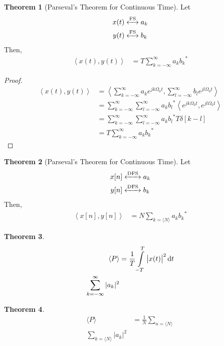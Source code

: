 \documentclass[titlepage, fleqn, a4paper, 12pt, twoside]{article}
\theoremstyle{definition}
\theoremstyle{theorem}
\newtheorem{theorem}{Theorem}
\newcommand{\FS}{\xleftrightarrow{\mathrm{FS}}}
\newcommand{\DFS}{\xleftrightarrow{\mathrm{DFS}}}
\begin{document}
\begin{theorem}[Parseval's Theorem for Continuous Time]
	Let
	\begin{align*}
		x(t) &\FS a_k\\
		y(t) &\FS b_k
	\end{align*}
	Then,
	\begin{align*}
		\left\langle x(t),y(t) \right\rangle &= T \sum\limits_{k = -\infty}^{\infty} a_k {b_k}^*
	\end{align*}
	\label{thm:Parseval's_Theorem_for_Continuous_Time}
\end{theorem}

\begin{proof}
	\begin{align*}
		\left\langle x(t),y(t) \right\rangle &= \left\langle \sum\limits_{k = -\infty}^{\infty} a_k e^{j k \Omega_0 t} , \sum\limits_{l = -\infty}^{\infty} b_l e^{j l \Omega_0 t} \right\rangle\\
		&= \sum\limits_{k = -\infty}^{\infty} \sum\limits_{l = -\infty}^{\infty} a_k {b_l}^* \left\langle e^{j k \Omega_0 t} , e^{j l \Omega_0 t} \right\rangle\\
		&= \sum\limits_{k = -\infty}^{\infty} \sum\limits_{l = -\infty}^{\infty} a_k {b_l}^* T \delta[k - l]\\
		&= T \sum\limits_{k = -\infty}^{\infty} a_k {b_k}^*
	\end{align*}
\end{proof}

\begin{theorem}[Parseval's Theorem for Continuous Time]
	Let
	\begin{align*}
		x[n] &\DFS a_k\\
		y[n] &\DFS b_k
	\end{align*}
	Then,
	\begin{align*}
		\left\langle x[n],y[n] \right\rangle &= N \sum\limits_{k = \langle N \rangle} a_k {b_k}^*
	\end{align*}
	\label{thm:Parseval's_Theorem_for_Discrete_Time}
\end{theorem}

\begin{theorem}
	\begin{align*}
		\langle P \rangle &= \frac{1}{T} \int\limits_{-T}^{T} \left| x(t) \right|^2 \dif t\\
		\sum\limits_{k = -\infty}^{\infty} |a_k|^2
	\end{align*}
\end{theorem}

\begin{theorem}
	\begin{align*}
		\langle P \rangle &= \frac{1}{N} \sum\limits_{n = \langle N \rangle}\\
		\sum\limits_{k = \langle N \rangle} |a_k|^2
	\end{align*}
\end{theorem}
\end{document}
